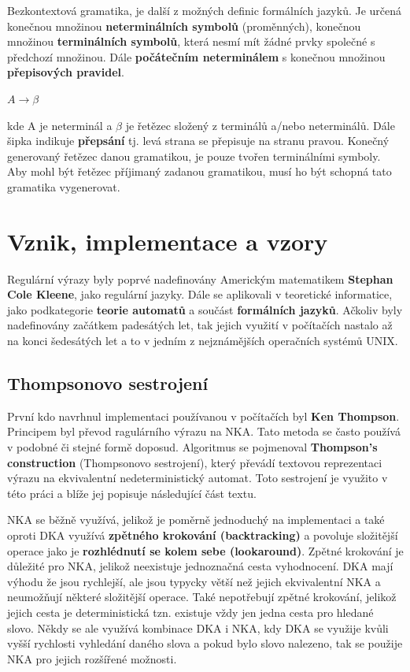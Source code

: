 Bezkontextová gramatika, je další z možných definic formálních jazyků. Je určená konečnou množinou \textbf{neterminálních symbolů} (proměnných), konečnou množinou \textbf{terminálních symbolů}, která nesmí mít žádné prvky společné s předchozí množinou.
Dále \textbf{počátečním neterminálem} s konečnou množinou \textbf{přepisových pravidel}\cite{MUNIFL}.

$A \longrightarrow \beta$

\noindent 
kde A je neterminál a $\beta$ je řetězec složený z terminálů a/nebo neterminálů. 
Dále šipka indikuje \textbf{přepsání} tj. levá strana se přepisuje na stranu pravou.
Konečný generovaný řetězec danou gramatikou, je pouze tvořen terminálními symboly.
Aby mohl být řetězec příjimaný zadanou gramatikou, musí ho být schopná tato gramatika vygenerovat.

\section{Vznik, implementace a vzory}
Regulární výrazy byly poprvé nadefinovány Americkým matematikem \textbf{Stephan Cole Kleene}, jako regulární jazyky. 
Dále se aplikovali v teoretické informatice, jako podkategorie \textbf{teorie automatů} a součást \textbf{formálních jazyků}.
Ačkoliv byly nadefinovány začátkem padesátých let, tak jejich využití v počítačích nastalo až na konci šedesátých let a to v 
jedním z nejznámějších operačních systémů UNIX.

\subsection*{Thompsonovo sestrojení}

První kdo navrhnul implementaci používanou v počítačích byl \textbf{Ken Thompson}.
Principem byl převod ragulárního výrazu na NKA.
Tato metoda se často používá v podobné či stejné formě doposud.
Algoritmus se pojmenoval \textbf{Thompson's construction} (Thompsonovo sestrojení), který převádí textovou reprezentaci výrazu na ekvivalentní nedeterministický automat.
Toto sestrojení je využito v této práci a blíže jej popisuje následující část textu.

NKA se běžně využívá, jelikož je poměrně jednoduchý na implementaci a
také oproti DKA využívá \textbf{zpětného krokování (backtracking)} a povoluje složitější operace jako je \textbf{rozhlédnutí se kolem sebe (lookaround)}.
Zpětné krokování je důležité pro NKA, jelikož neexistuje jednoznačná cesta vyhodnocení.
DKA mají výhodu že jsou rychlejší, ale jsou typycky větší než jejich ekvivalentní NKA a neumožňují některé složitější operace.
Také nepotřebují zpětné krokování, jelikož jejich cesta je deterministická tzn. existuje vždy jen jedna cesta pro hledané slovo.
Někdy se ale využívá kombinace DKA i NKA, kdy DKA se využije kvůli vyšší rychlosti vyhledání daného slova a pokud bylo slovo nalezeno, 
tak se použije NKA pro jejich rozšířené možnosti.

